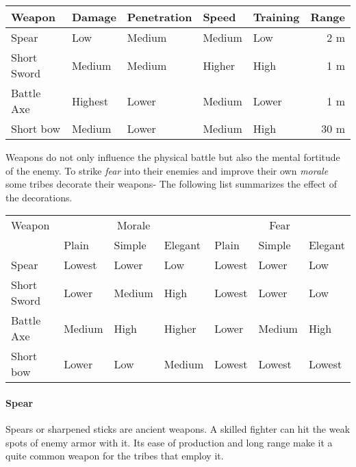 \begin{longtable}{lllllr}
	\toprule
	Weapon
	       & Damage  & Penetration
	       & Speed   & Training    & Range \\
	\midrule
	Spear
	       & Low     & Medium
	       & Medium  & Low         & 2 m   \\
	Short Sword
	       & Medium  & Medium
	       & Higher  & High        & 1 m   \\
	Battle Axe
	       & Highest & Lower
	       & Medium  & Lower       & 1 m   \\
	Short bow
	       & Medium  & Lower       &
	Medium & High    & 30 m                \\
	\bottomrule
\end{longtable}

Weapons do not only influence the physical battle but also the mental fortitude
of the enemy. To strike \emph{fear} into their enemies and improve their own
\emph{morale} some tribes decorate their weapons- The following list summarizes
the effect of the decorations.

\begin{longtable}{l ll ll ll}
	\toprule
	Weapon
	 & \multicolumn{3}{c}{Morale}
	 & \multicolumn{3}{c}{Fear}
	\\
	 & Plain                      & Simple & Elegant
	 & Plain                      & Simple & Elegant \\
	\midrule
	Spear
	 & Lowest                     & Lower  & Low
	 & Lowest                     & Lower  & Low     \\
	Short Sword
	 & Lower                      & Medium & High
	 & Lowest                     & Lower  & Low     \\
	Battle Axe
	 & Medium                     & High   & Higher
	 & Lower                      & Medium & High    \\
	Short bow
	 & Lower                      & Low    & Medium
	 & Lowest                     & Lowest & Lowest  \\
	\bottomrule
\end{longtable}

\paragraph{Spear}
Spears or sharpened sticks are ancient weapons. A skilled fighter can hit the
weak spots of enemy armor with it. Its ease of production and long range make
it a quite common weapon for the tribes that employ it.

